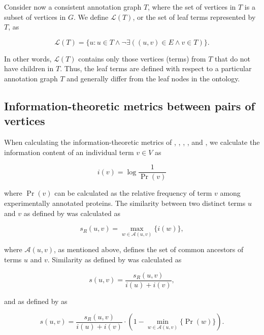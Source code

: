 Consider now a consistent annotation graph $T$, where the set of vertices in $T$ is a subset of vertices in $G$. We define $\mathcal{L}(T)$, or the set of leaf terms represented by $T$, as

\begin{equation}
\mathcal{L}(T)=\{u : u \in T \land \lnot\exists ( (u, v) \in E  \land v \in T)\}.
\end{equation}

\noindent
In other words, $\mathcal{L}(T)$ contains only those vertices (terms) from $T$ that do not have children in $T$. Thus, the leaf terms are defined with respect to a particular annotation graph $T$ and generally differ from the leaf nodes in the ontology. 

\subsection{Information-theoretic metrics between pairs of vertices}

When calculating the information-theoretic metrics of \citet{Resnik1995}, \citet{Jiang1997}, \citet{Lin1998}, \citet{Lord2003}, and \citet{Schlicker2006}, we calculate the information content of an individual term $v \in V$ as

\begin{equation}
i(v)=\log\frac{1}{\Pr(v)}
\end{equation}

\noindent
where $\Pr(v)$ can be calculated as the relative frequency of term $v$ among experimentally annotated proteins. The similarity between two distinct terms $u$ and $v$ as defined by \citet{Resnik1995} was calculated as

\begin{equation}
s_{R}(u,v)=\underset{w\in \mathcal{A}(u,v)}{\max}\{i(w)\},
\end{equation}

\noindent where $\mathcal{A}(u, v)$, as mentioned above, defines the set of common ancestors of terms $u$ and $v$. Similarity as defined by \citet{Lin1998} was calculated as

\begin{equation}
s(u,v)=\frac{s_{R}(u,v)}{i(u)+i(v)},
\end{equation}

\noindent and as defined by \citet{Schlicker2006} as

\begin{equation}
s(u,v)=\frac{s_{R}(u,v)}{i(u)+i(v)}\cdot(1-\underset{w\in \mathcal{A}(u,v)}{\min}\{\Pr(w)\}).
\end{equation}

